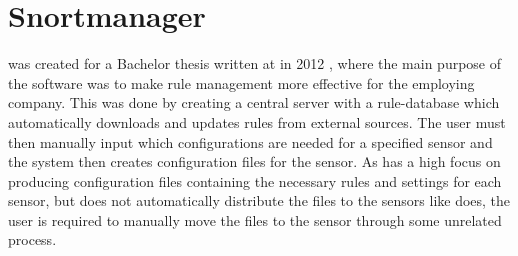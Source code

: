 \section{Snortmanager}
\snortmanager{} was created for a Bachelor thesis written at \GUC{} in 2012
\cite{SnortManager}, where the main purpose of the software was to make rule
management more effective for the employing company. This was done by creating a central
server with a rule-database which automatically downloads and updates rules from
external sources. The user must then manually input which configurations are
needed for a specified sensor and the system then creates configuration files
for the sensor.
As \snortmanager{} has a high focus on producing configuration files containing
the necessary rules and settings for each sensor, but does not automatically distribute the files to the sensors like \snowman{}
does, the user is required to manually move the files to the sensor through some
unrelated process.

